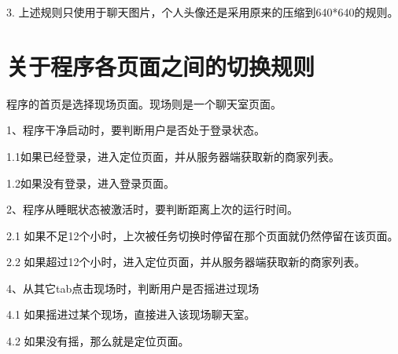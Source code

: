 \documentclass[cs4size]{ctexartutf8}
\begin{document}
3. 上述规则只使用于聊天图片，个人头像还是采用原来的压缩到640*640的规则。


\section{关于程序各页面之间的切换规则}

程序的首页是选择现场页面。现场则是一个聊天室页面。

1、程序干净启动时，要判断用户是否处于登录状态。

1.1如果已经登录，进入定位页面，并从服务器端获取新的商家列表。

1.2如果没有登录，进入登录页面。


2、程序从睡眠状态被激活时，要判断距离上次的运行时间。

2.1 如果不足12个小时，上次被任务切换时停留在那个页面就仍然停留在该页面。

2.2 如果超过12个小时，进入定位页面，并从服务器端获取新的商家列表。



4、从其它tab点击现场时，判断用户是否摇进过现场

4.1 如果摇进过某个现场，直接进入该现场聊天室。

4.2 如果没有摇，那么就是定位页面。




\newpage
\end{document}
